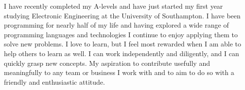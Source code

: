 
I have recently completed my A-levels and have just started my first year studying Electronic Engineering at the University of Southampton. I have been programming for nearly half of my life and having explored a wide range of programming languages and technologies I continue to enjoy applying them to solve new problems. I love to learn, but I feel most rewarded when I am able to help others to learn as well. I can work independently and diligently, and I can quickly grasp new concepts. My aspiration to contribute usefully and meaningfully to any team or business I work with and to aim to do so with a friendly and enthusiastic attitude.
